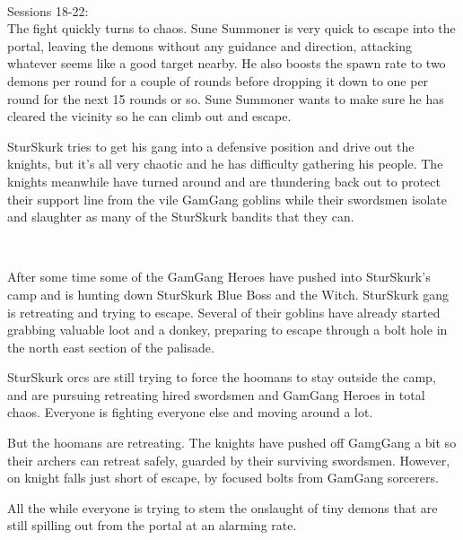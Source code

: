\


Sessions 18-22:\\
The fight quickly turns to chaos. Sune Summoner is very quick to escape into the portal, leaving the demons without any guidance and direction, attacking whatever seems like a good target nearby. He also boosts the spawn rate to two demons per round for a couple of rounds before dropping it down to one per round for the next 15 rounds or so. Sune Summoner wants to make sure he has cleared the vicinity so he can climb out and escape.

SturSkurk tries to get his gang into a defensive position and drive out the knights, but it's all very chaotic and he has difficulty gathering his people. The knights meanwhile have turned around and are thundering back out to protect their support line from the vile GamGang goblins while their swordsmen isolate and slaughter as many of the SturSkurk bandits that they can.

\

After some time some of the GamGang Heroes have pushed into SturSkurk's camp and is hunting down SturSkurk Blue Boss and the Witch. SturSkurk gang is retreating and trying to escape. Several of their goblins have already started grabbing valuable loot and a donkey, preparing to escape through a bolt hole in the north east section of the palisade.

SturSkurk orcs are still trying to force the hoomans to stay outside the camp, and are pursuing retreating hired swordsmen and GamGang Heroes in total chaos. Everyone is fighting everyone else and moving around a lot.

But the hoomans are retreating. The knights have pushed off GamgGang a bit so their archers can retreat safely, guarded by their surviving swordsmen. However, on knight falls just short of escape, by focused bolts from GamGang sorcerers.

All the while everyone is trying to stem the onslaught of tiny demons that are still spilling out from the portal at an alarming rate.

\


